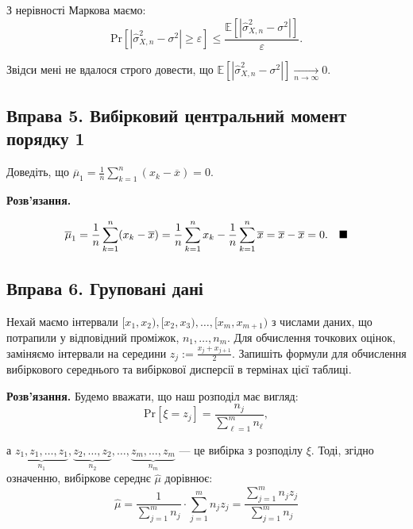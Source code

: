 \documentclass{hw_template}
\begin{document}
З нерівності Маркова маємо:
\begin{equation*}
    \text{Pr}[|\hat{\sigma}_{X,n}^2 - \sigma^2| \geq \varepsilon] \leq \frac{\mathbb{E}[|\hat{\sigma}_{X,n}^2 - \sigma^2|]}{\varepsilon}.
\end{equation*}

Звідси мені не вдалося строго довести, що $\mathbb{E}[|\hat{\sigma}_{X,n}^2 - \sigma^2|] \xrightarrow[n \to \infty]{} 0$.

\subsection{Вправа 5. Вибірковий центральний момент порядку 1}

\begin{problem}
    Доведіть, що $\overline{\mu}_1 = \frac{1}{n}\sum_{k=1}^n (x_k - \overline{x}) = 0$.
\end{problem}

\textbf{Розв'язання.}

\begin{equation*}
    \overline{\mu}_1 = \frac{1}{n}\sum_{k=1}^n (x_k - \overline{x}) = \frac{1}{n}\sum_{k=1}^n x_k - \frac{1}{n}\sum_{k=1}^n \overline{x} = \overline{x} - \overline{x} = 0. \quad \hfill \blacksquare
\end{equation*}

\pagebreak

\subsection{Вправа 6. Груповані дані}

\begin{problem}
    Нехай маємо інтервали $[x_1,x_2), [x_2,x_3), \dots, [x_m, x_{m+1})$ з числами даних, що потрапили у відповідний проміжок, $n_1,\dots,n_m$. Для обчислення точкових оцінок, заміняємо інтервали на середини $z_j := \frac{x_j+x_{j+1}}{2}$. Запишіть формули для обчислення вибіркового середнього та вибіркової дисперсії в термінах цієї таблиці.
\end{problem}

\textbf{Розв'язання.} Будемо вважати, що наш розподіл має вигляд:
\begin{equation*}
    \text{Pr}[\xi = z_j] = \frac{n_j}{\sum_{\ell=1}^m n_{\ell}},
\end{equation*}

а $\underbrace{z_1,z_1,\dots,z_1}_{n_1}, \underbrace{z_2,\dots,z_2}_{n_2}, \dots, \underbrace{z_m, \dots, z_m}_{n_m}$ --- це вибірка з розподілу $\xi$. Тоді, згідно означенню, вибіркове середнє $\hat{\mu}$ дорівнює:
\begin{equation*}
    \hat{\mu} = \frac{1}{\sum_{j=1}^m n_j} \cdot \sum_{j=1}^m n_jz_j = \frac{\sum_{j=1}^m n_jz_j}{\sum_{j=1}^m n_j}
\end{equation*}
\end{document}
